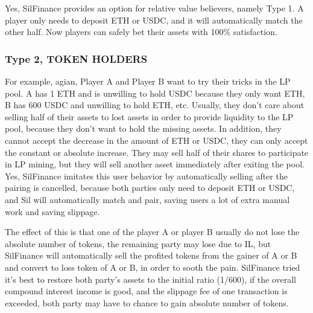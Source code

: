 \documentclass[11pt,letterpaper]{article}
\begin{document}
\begin{multicols}{2}
Yes, SilFinance provides an option for relative value believers, namely Type 1. A player only needs to deposit ETH or USDC, and it will automatically match the other half. Now players can safely bet their assets with 100\% satisfaction.

\subsubsection{Type 2, TOKEN HOLDERS}
For example, agian, Player A and Player B want to try their tricks in the LP pool. A has 1 ETH and is unwilling to hold USDC because they only want ETH, B has 600
USDC and unwilling to hold ETH, etc. Usually, they don't care about selling half of their assets to lost assets in order to provide liquidity to the LP pool, because they don't want to hold the missing assets. In addition, they cannot accept the decrease in the amount of ETH or USDC, they can only accept the constant or absolute increase. They may sell half of their shares to participate in LP mining, but they will sell another asset immediately after exiting the pool. Yes, SilFinance imitates this user behavior by automatically selling after the pairing is cancelled, because both parties only need to deposit ETH or USDC, and Sil will automatically match and pair, saving users a lot of extra manual work and saving slippage.

The effect of this is that one of the player A or player B usually do not lose the absolute number of tokens, the remaining party may lose due to IL, but SilFinance will automatically sell the profited tokens from the gainer of A or B and convert to loss token of A or B, in order to sooth the pain. SilFinance tried it's best to restore both party's assets to the initial ratio (1/600), if the overall compound interest income is good, and the slippage fee of one transaction is exceeded, both party may have to chance to gain absolute number of tokens.

\end{multicols}
\end{document}

